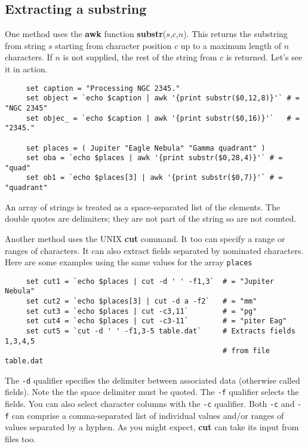 \newpage
\subsection{Extracting a substring
\label{sc4_se_string_ex_substr}}

One method uses the {\bf awk} function {\bf substr}($s$,$c$,$n$).  This
returns the substring from string $s$ starting from character position
$c$ up to a maximum length of $n$ characters.  If $n$ is not supplied,
the rest of the string from $c$ is returned.  Let's see it in action.

\small
\begin{verbatim}
     set caption = "Processing NGC 2345."
     set object = `echo $caption | awk '{print substr($0,12,8)}'` # = "NGC 2345"
     set objec_ = `echo $caption | awk '{print substr($0,16)}'`   # = "2345."

     set places = ( Jupiter "Eagle Nebula" "Gamma quadrant" )
     set oba = `echo $places | awk '{print substr($0,28,4)}'` # = "quad"
     set ob1 = `echo $places[3] | awk '{print substr($0,7)}'` # = "quadrant"
\end{verbatim}
\normalsize
An array of strings is treated as a space-separated list of the elements.
The double quotes are delimiters; they are not part of the string so
are not counted.

Another method uses the UNIX {\bf cut} command.  It too can specify a
range or ranges of characters.  It can also extract fields separated
by nominated characters.  Here are some examples using the same values
for the array {\tt places}

\small
\begin{verbatim}
     set cut1 = `echo $places | cut -d ' ' -f1,3`  # = "Jupiter Nebula"
     set cut2 = `echo $places[3] | cut -d a -f2`   # = "mm"
     set cut3 = `echo $places | cut -c3,11`        # = "pg"
     set cut4 = `echo $places | cut -c3-11`        # = "piter Eag"
     set cut5 = `cut -d ' ' -f1,3-5 table.dat`     # Extracts fields 1,3,4,5
                                                   # from file table.dat

\end{verbatim}
\normalsize

The {\tt -d} qualifier specifies the delimiter between associated data
(otherwise called fields).  Note the the space delimiter must be quoted.
The {\tt -f} qualifier selects the fields.  You can also select
character columns with the {\tt -c} qualifier.  Both {\tt -c} and
{\tt -f} can comprise a comma-separated list of individual values and/or
ranges of values separated by a hyphen.  As you might expect,
{\bf cut} can take its input from files too.



